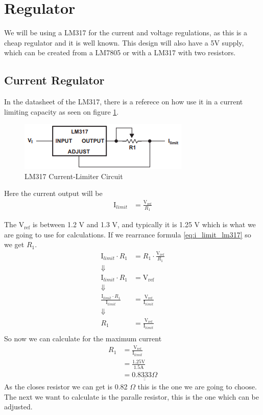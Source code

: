 \section{Regulator}

We will be using a LM317 for the current and voltage regulations, 
as this is a cheap regulator and it is well known. 
This design will also have a 5V supply, 
which can be created from a LM7805 or with a LM317 with two resistors.

\subsection{Current Regulator}
In the datasheet of the LM317, there is a referece on how use it in a current limiting capacity as seen on figure \ref{fig:lm317_current_limit}.
\begin{figure}[ht]
    \centering
    \caption{LM317 Current-Limiter Circuit}\label{fig:lm317_current_limit}
    \includegraphics{img/current_limit.png}
\end{figure}

Here the current output will be 
\begin{align}
    \text{I}_{limit} &= \frac{\text{V}_{\text{ref}}}{R_{1}} \label{eq:i_limit_lm317}
\end{align}

The V$_{\text{ref}}$ is between 1.2 V and 1.3 V, and typically it is 1.25 V which is what we are going to use for calculations.
If we rearrance formula \ref{eq:i_limit_lm317} so we get $R_{1}$.
\begin{align}
    \text{I}_{limit} \cdot R_{1} &= R_{1} \cdot \frac{\text{V}_{\text{ref}}}{R_{1}} \nonumber \\
    \Downarrow  \nonumber \\
    \text{I}_{limit} \cdot R_{1} &= \text{V}_{\text{ref}} \nonumber \\
    \Downarrow  \nonumber \\
    \frac{ \text{I}_{limit} \cdot R_{1} }{\text{I}_{limit}} &= \frac{\text{V}_{\text{ref}}}{\text{I}_{limit}} \nonumber \\
    \Downarrow  \nonumber \\
    R_{1} &= \frac{\text{V}_{\text{ref}}}{\text{I}_{limit}}\\
\end{align}
So now we can calculate for the maximum current
\begin{align}
    R_{1}   &= \frac{\text{V}_{\text{ref}}}{\text{I}_{limit}} \nonumber \\
            &= \frac{1.25 \text{V}}{1.5\text{A}} \nonumber \\
            &= \underline{ \underline{ 0.8333 \Omega}}
\end{align}
As the closes resistor we can get is 0.82 $\Omega$ this is the one we are going to choose.
The next we want to calculate is the paralle resistor, this is the one which can be adjusted.